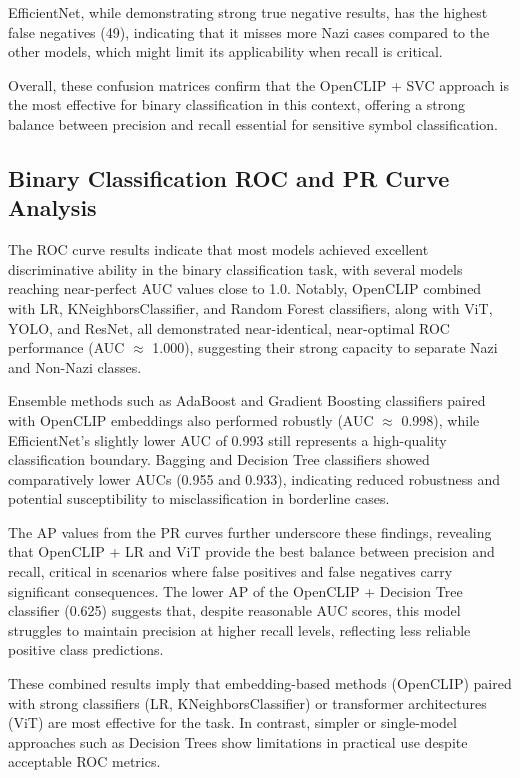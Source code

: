 EfficientNet, while demonstrating strong true negative results, has the highest false negatives (49), indicating
that it misses more Nazi cases compared to the other models, which might limit its applicability when recall is critical.

Overall, these confusion matrices confirm that the OpenCLIP + \ac{SVC} approach is the most effective for binary
classification in this context, offering a strong balance between precision and recall essential for sensitive
symbol classification.

\subsection{Binary Classification \ac{ROC} and \ac{PR} Curve Analysis}

The \ac{ROC} curve results indicate that most models achieved excellent discriminative ability in the binary
classification task, with several models reaching near-perfect \ac{AUC} values close to 1.0. Notably, OpenCLIP combined
with \ac{LR}, KNeighborsClassifier, and Random Forest classifiers, along with \ac{ViT}, \ac{YOLO},
and \ac{ResNet}, all demonstrated near-identical, near-optimal \ac{ROC} performance (\ac{AUC} $\approx$ 1.000),
suggesting their strong capacity to separate Nazi and Non-Nazi classes.

Ensemble methods such as AdaBoost and Gradient Boosting classifiers paired with OpenCLIP embeddings also performed
robustly (\ac{AUC} $\approx$ 0.998), while EfficientNet’s slightly lower \ac{AUC} of 0.993 still represents a high-quality
classification boundary. Bagging and Decision Tree classifiers showed comparatively lower \ac{AUC}s (0.955 and 0.933),
indicating reduced robustness and potential susceptibility to misclassification in borderline cases.

The \ac{AP} values from the \ac{PR} curves further underscore these findings, revealing that
OpenCLIP + \ac{LR} and \ac{ViT} provide the best balance between precision and recall, critical in scenarios where false
positives and false negatives carry significant consequences. The lower \ac{AP} of the OpenCLIP + Decision Tree
classifier (0.625) suggests that, despite reasonable \ac{AUC} scores, this model struggles to maintain precision at
higher recall levels, reflecting less reliable positive class predictions.

These combined results imply that embedding-based methods (OpenCLIP) paired with strong classifiers (\ac{LR},
KNeighborsClassifier) or transformer architectures (\ac{ViT}) are most effective for the task. In contrast, simpler or single-model
approaches such as Decision Trees show limitations in practical use despite acceptable \ac{ROC} metrics.

